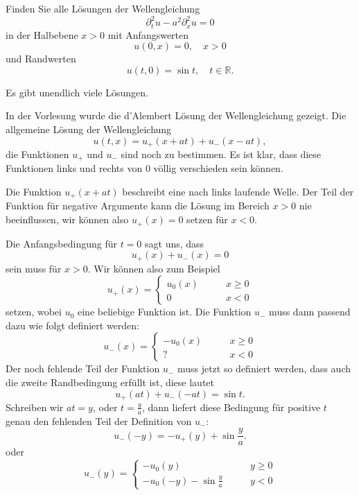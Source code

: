 Finden Sie alle Lösungen der Wellengleichung
\[
\partial_t^2u-a^2\partial_x^2u=0
\]
in der Halbebene $x>0$ mit Anfangswerten
\[
u(0,x)=0,\quad x>0
\]
und Randwerten
\[
u(t,0)=\sin t,\quad t\in\mathbb R.
\]

\begin{hinweis}
Es gibt unendlich viele Lösungen.
\end{hinweis}

\begin{loesung}
In der Vorlesung wurde die d'Alembert Lösung der Wellengleichung
gezeigt. Die allgemeine Lösung der Wellengleichung
\[
u(t,x)
=
u_+(x+at)+u_-(x-at),
\]
die Funktionen $u_+$ und $u_-$ sind noch zu bestimmen. Es ist klar,
dass diese Funktionen links und rechts von $0$ völlig verschieden sein
können.

Die Funktion $u_+(x+at)$ beschreibt eine nach links laufende
Welle. Der Teil der Funktion für negative Argumente kann
die Lösung im Bereich $x>0$ nie
beeinflussen, wir können also $u_+(x)=0$ setzen für $x<0$.

Die Anfangsbedingung für $t=0$ sagt uns, dass
\[
u_+(x)+u_-(x)=0
\]
sein muss für $x>0$. Wir können also zum Beispiel
\[
u_+(x)=\begin{cases}u_0(x)&\qquad x\ge 0\\
0&\qquad x<0
\end{cases}
\]
setzen, wobei $u_0$ eine beliebige Funktion ist. Die Funktion $u_-$ muss
dann passend dazu wie folgt definiert werden:
\[
u_-(x)=\begin{cases}
-u_0(x)&\qquad x\ge 0\\
?&\qquad x<0
\end{cases}
\]
Der noch fehlende Teil der Funktion $u_-$ muss jetzt so definiert werden,
dass auch die zweite Randbedingung erfüllt ist, diese lautet
\[
u_+(at)+u_-(-at)=\sin t.
\]
Schreiben wir $at=y$, oder $t=\frac{y}{a}$, dann liefert diese Bedingung
für positive $t$ genau den fehlenden Teil der Definition von $u_-$:
\[
u_-(-y)=-u_+(y)+\sin \frac{y}{a}.
\]
oder
\[
u_-(y)=\begin{cases}
-u_0(y)&\qquad y\ge 0\\
-u_0(-y)-\sin{\displaystyle\frac{y}{a}}&\qquad y<0
\end{cases}
\]
\end{loesung}
